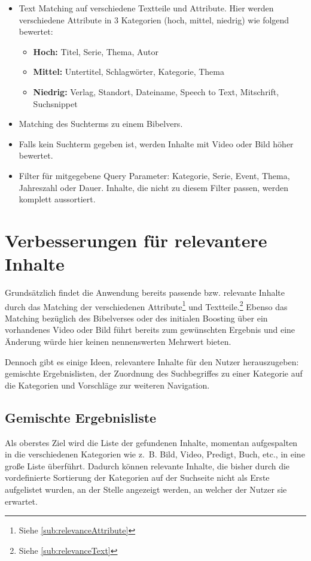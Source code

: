 \begin{itemize}
  \item Text Matching auf verschiedene Textteile und Attribute. Hier werden verschiedene Attribute in 3 Kategorien (hoch, mittel, niedrig) wie folgend bewertet:
  \begin{itemize}
    \item \textbf{Hoch:} Titel, Serie, Thema, Autor
    \item \textbf{Mittel:} Untertitel, Schlagwörter, Kategorie, Thema
    \item \textbf{Niedrig:} Verlag, Standort, Dateiname, Speech to Text, Mitschrift, Suchsnippet
  \end{itemize}
  \item Matching des Suchterms zu einem Bibelvers.
  \item Falls kein Suchterm gegeben ist, werden Inhalte mit Video oder Bild höher bewertet.
  \item Filter für mitgegebene Query Parameter: Kategorie, Serie, Event, Thema, Jahreszahl oder Dauer. Inhalte, die nicht zu diesem Filter passen, werden komplett aussortiert.
\end{itemize}

\section{Verbesserungen für relevantere Inhalte}
\label{sec:potential}

Grundsätzlich findet die Anwendung bereits passende bzw. relevante Inhalte durch das Matching der verschiedenen Attribute\footnote{Siehe \ref{sub:relevanceAttribute}} und Textteile.\footnote{Siehe \ref{sub:relevanceText}}
Ebenso das Matching bezüglich des Bibelverses oder des initialen Boosting über ein vorhandenes Video oder Bild führt bereits zum gewünschten Ergebnis und eine Änderung würde hier keinen nennenswerten Mehrwert bieten.

Dennoch gibt es einige Ideen, relevantere Inhalte für den Nutzer herauszugeben: gemischte Ergebnislisten, der Zuordnung des Suchbegriffes zu einer Kategorie auf die Kategorien und Vorschläge zur weiteren Navigation.

\subsection{Gemischte Ergebnisliste}
\label{sub:unifiedList}
Als oberstes Ziel wird die Liste der gefundenen Inhalte, momentan aufgespalten in die verschiedenen Kategorien wie z. B. Bild, Video, Predigt, Buch, etc., in eine große Liste überführt.
Dadurch können relevante Inhalte, die bisher durch die vordefinierte Sortierung der Kategorien auf der Suchseite nicht als Erste aufgelistet wurden, an der Stelle angezeigt werden, an welcher der Nutzer sie erwartet.

